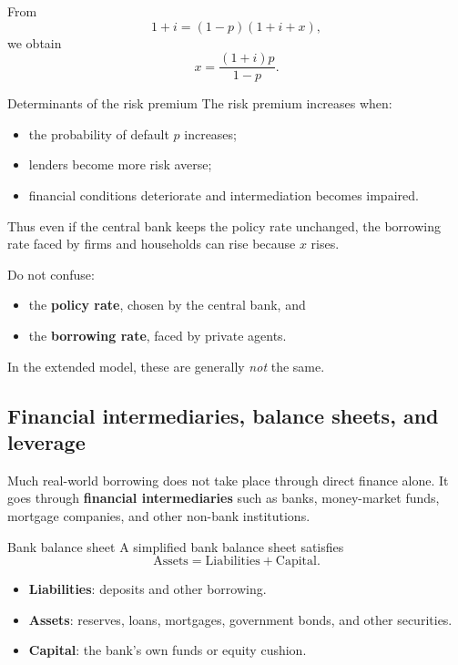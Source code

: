 \begin{keyformula}[title={Key Formula: Risk premium in a simple default model}]
From
\[
1+i = (1-p)(1+i+x),
\]
we obtain
\[
x = \frac{(1+i)p}{1-p}.
\]
\end{keyformula}

\begin{theorem}{Determinants of the risk premium}{}
The risk premium increases when:
\begin{itemize}[leftmargin=1.5em]
    \item the probability of default $p$ increases;
    \item lenders become more risk averse;
    \item financial conditions deteriorate and intermediation becomes impaired.
\end{itemize}
\end{theorem}

\noindent
Thus even if the central bank keeps the policy rate unchanged, the borrowing rate faced by firms and households can rise because $x$ rises.

\begin{commonmistake}
Do not confuse:
\begin{itemize}[leftmargin=1.5em]
    \item the \textbf{policy rate}, chosen by the central bank, and
    \item the \textbf{borrowing rate}, faced by private agents.
\end{itemize}
In the extended model, these are generally \emph{not} the same.
\end{commonmistake}

\subsection{Financial intermediaries, balance sheets, and leverage}

Much real-world borrowing does not take place through direct finance alone. It goes through \textbf{financial intermediaries} such as banks, money-market funds, mortgage companies, and other non-bank institutions.

\begin{definition}{Bank balance sheet}{}
A simplified bank balance sheet satisfies
\[
\text{Assets} = \text{Liabilities} + \text{Capital}.
\]
\begin{itemize}[leftmargin=1.5em]
    \item \textbf{Liabilities}: deposits and other borrowing.
    \item \textbf{Assets}: reserves, loans, mortgages, government bonds, and other securities.
    \item \textbf{Capital}: the bank's own funds or equity cushion.
\end{itemize}
\end{definition}

